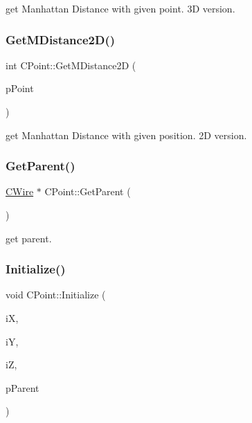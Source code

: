 get Manhattan Distance with given point. 3D version. 

\mbox{\label{classCPoint_ab6f68628b53f852dc41210196464c004}} 
\subsubsection{\texorpdfstring{GetMDistance2D()}{GetMDistance2D()}}
{\footnotesize\ttfamily int C\+Point\+::\+Get\+M\+Distance2D (\begin{DoxyParamCaption}\item[{\mbox{\hyperlink{classCPoint}{C\+Point}} $\ast$}]{p\+Point }\end{DoxyParamCaption})}



get Manhattan Distance with given position. 2D version. 

\mbox{\label{classCPoint_ac87cc89b531011be9c848630da1343b7}} 
\subsubsection{\texorpdfstring{GetParent()}{GetParent()}}
{\footnotesize\ttfamily \mbox{\hyperlink{classCWire}{C\+Wire}} $\ast$ C\+Point\+::\+Get\+Parent (\begin{DoxyParamCaption}{ }\end{DoxyParamCaption})}



get parent. 

\mbox{\label{classCPoint_a763a48a1efdcdaea63cfa4a9be8c4c48}} 
\subsubsection{\texorpdfstring{Initialize()}{Initialize()}}
{\footnotesize\ttfamily void C\+Point\+::\+Initialize (\begin{DoxyParamCaption}\item[{int}]{iX,  }\item[{int}]{iY,  }\item[{int}]{iZ,  }\item[{\mbox{\hyperlink{classCWire}{C\+Wire}} $\ast$}]{p\+Parent }\end{DoxyParamCaption})\hspace{0.3cm}{\ttfamily [virtual]}}

